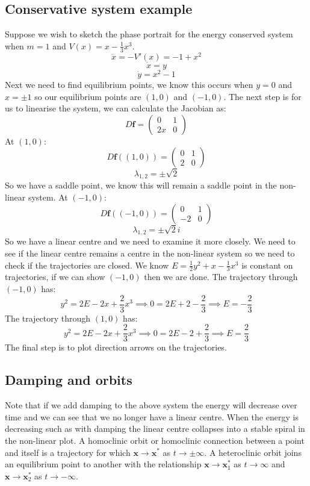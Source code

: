 \documentclass[12pt]{article}
\begin{document}
\subsection*{Conservative system example}
Suppose we wish to sketch the phase portrait for the energy conserved system when \(m=1\) and \(V(x)=x-\frac{1}{3}x^3\).
\[\ddot{x}=-V'(x)=-1+x^2\]
\[\dot{x}=y\]
\[\dot{y}=x^2-1\]
Next we need to find equilibrium points, we know this occurs when \(y=0\) and \(x=\pm 1\) so our equilibrium points are \((1,0)\) and \((-1,0)\). The next step is for us to linearise the system, we can calculate the Jacobian as:
\[D\textbf{f}=\begin{pmatrix}
    0 & 1 \\
    2x & 0
\end{pmatrix}\]
At \((1,0):\)
\[D\textbf{f}((1,0))=\begin{pmatrix}
    0 & 1 \\
    2 & 0
\end{pmatrix}\]
\[\lambda_{1,2}=\pm \sqrt{2}\]
So we have a saddle point, we know this will remain a saddle point in the non-linear system. At \((-1,0):\)
\[D\textbf{f}((-1,0))=\begin{pmatrix}
    0 & 1 \\
    -2 & 0
\end{pmatrix}\]
\[\lambda_{1,2}=\pm\sqrt{2}i\]
So we have a linear centre and we need to examine it more closely. We need to see if the linear centre remains a centre in the non-linear system so we need to check if the trajectories are closed. We know \(E=\frac{1}{2}y^2+x-\frac{1}{3}x^3\) is constant on trajectories, if we can show \((-1,0)\) then we are done. The trajectory through \((-1,0)\) has:
\[y^2=2E-2x+\frac{2}{3}x^3\implies0=2E+2-\frac{2}{3}\implies E=-\frac{2}{3}\]
The trajectory through \((1,0)\) has:
\[y^2=2E-2x+\frac{2}{3}x^3\implies0=2E-2+\frac{2}{3}\implies E=\frac{2}{3}\]
The final step is to plot direction arrows on the trajectories.
\subsection*{Damping and orbits}
Note that if we add damping to the above system the energy will decrease over time and we can see that we no longer have a linear centre. When the energy is decreasing such as with damping the linear centre collapses into a stable spiral in the non-linear plot.  A homoclinic orbit or homoclinic connection between a point and itself is a trajectory for which \(\textbf{x}\to\textbf{x}^*\) as \(t\to\pm\infty\). A heteroclinic orbit joins an equilibrium point to another with the relationship \(\textbf{x}\to \textbf{x}_1^*\) as  \(t\to\infty\) and \(\textbf{x}\to\textbf{x}_2^*\) as \(t\to -\infty\).
\end{document}
